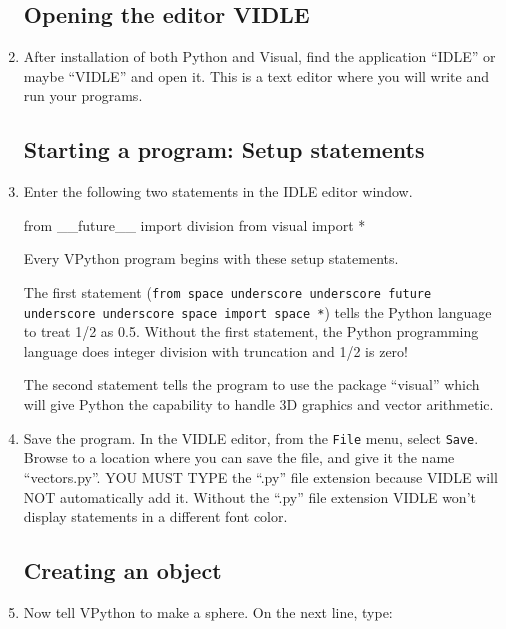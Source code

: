 \begin{enumerate}

	\subsection*{Opening the editor VIDLE}

	\item After installation of both Python and Visual, find the application ``IDLE'' or maybe ``VIDLE'' and open it. This is a text editor where you will write and run your programs.
	
	\subsection*{Starting a program:  Setup statements}
	
	\item Enter the following two statements in the IDLE editor window.
	
\begin{myvpython}
from  __future__  import division
from visual import *
\end{myvpython}
	
Every VPython program begins with these setup statements. 

The first statement (\texttt{from space underscore underscore future underscore underscore space import space *}) tells the Python language to treat 1/2 as 0.5. Without the first statement, the Python programming language does integer division with truncation and 1/2 is zero!

The second statement tells the program to use the package ``visual'' which will give Python the capability to handle 3D graphics and vector arithmetic.

	\item Save the program. In the VIDLE editor, from the \texttt{File} menu, select \texttt{Save}.  Browse to a location where you can save the file, and give it the name ``vectors.py''. YOU MUST TYPE the ``.py'' file extension because VIDLE will NOT automatically add it. Without the ``.py'' file extension VIDLE won't display statements in a different font color.
	
	\subsection*{Creating an object}

	\item Now tell VPython to make a sphere. On the next line, type:


\end{enumerate}
